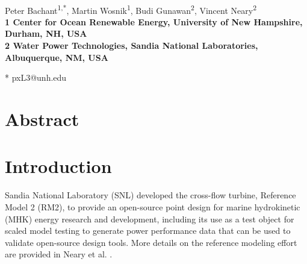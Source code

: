 \documentclass[10pt,letterpaper]{article}
\date{}
\begin{document}
\vspace*{0.35in}

\begin{flushleft}

{\Large \textbf{}}
\newline
\\
Peter Bachant\textsuperscript{1,*},
Martin Wosnik\textsuperscript{1},
Budi Gunawan\textsuperscript{2},
Vincent Neary\textsuperscript{2}
\\
\bigskip
\bf{1} Center for Ocean Renewable Energy, University of New Hampshire, Durham, NH, 
USA
\\
\bf{2} Water Power Technologies, Sandia National Laboratories, Albuquerque, NM, USA
\\
\bigskip

* pxL3@unh.edu

\end{flushleft}

\listoftodos

\section*{Abstract}



\linenumbers

\section*{Introduction} Sandia National Laboratory (SNL) developed the
cross-flow turbine, Reference Model 2 (RM2), to provide an open-source point
design for marine hydrokinetic (MHK) energy research and development, including
its use as a test object for scaled model testing to generate power performance
data that can be used to validate open-source design tools. More details on the
reference modeling effort are provided in Neary et al. \cite{Neary2014}.
\end{document}
